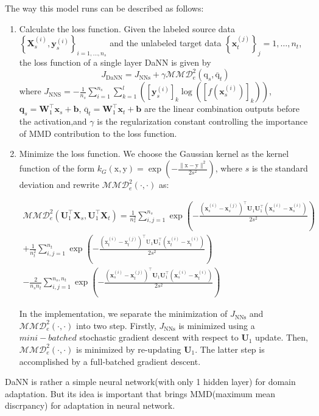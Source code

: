 \documentclass[conference]{IEEEtran}
\begin{document}
The way this model runs can be described as follows:
\begin{enumerate}
\item Calculate the loss function. Given the labeled source data $\left\{\mathbf{X}_{s}^{(i)}, \mathbf{y}_{s}^{(i)}\right\}_{i=1, \ldots, n_{s}}$ and the unlabeled target data $\left\{\mathbf{x}_{t}^{(j)}\right\}_{j}=1, \ldots, n_{t}$, the loss function of a single layer DaNN is given by
\begin{equation}
J_{\mathrm{DaNN}}=J_{\mathrm{NNs}}+\gamma \mathcal{M M D}_{e}^{2}\left(\mathrm{q}_{s}, \overline{\mathrm{q}}_{t}\right)
\end{equation}
where $J_{\mathrm{NNS}}=-\frac{1}{n_{s}} \sum_{i=1}^{n_{s}} \sum_{k=1}^{l}\left(\left[\mathbf{y}_{s}^{(i)}\right]_{k} \log \left(\left[f\left(\mathbf{x}_{s}^{(i)}\right)\right]_{k}\right)\right)$, $\mathbf{q}_{s}=\mathbf{W}_{1}^{\top} \mathbf{x}_{s}+\mathbf{b}$, $\overline{\mathrm{q}}_{t}= \mathbf{W}_{1}^{\top} \mathbf{x}_{t}+\mathbf{b}$ are the linear combination outputs before the activation,and $\gamma$ is the regularization constant controlling the importance of MMD contribution to the loss function.\\
\item Minimize the loss function. We choose the Gaussian kernel as the kernel function of the form $k_{G}(\mathrm{x}, \mathrm{y})=\exp \left(-\frac{\|\mathrm{x}-\mathrm{y}\|^{2}}{2 s^{2}}\right)$, where $s$ is the standard deviation and rewrite $\mathcal{M} \mathcal{M} \mathcal{D}_{e}^{2}(\cdot, \cdot)$ as:
\begin{tiny}
\begin{eqnarray}
\mathcal{M M D}_{e}^{2}\left(\mathbf{U}_{1}^{\top} \mathbf{X}_{s}, \mathbf{U}_{1}^{\top} \mathbf{X}_{t}\right)=\frac{1}{n_{s}^{2}} \sum_{i, j=1}^{n_{s}} \exp \left(-\frac{\left(\mathbf{x}_{s}^{(i)}-\mathbf{x}_{s}^{(j)}\right)^{\top} \mathbf{U}_{1} \mathbf{U}_{1}^{\top}\left(\mathbf{x}_{s}^{(i)}-\mathbf{x}_{s}^{(i)}\right)}{2 s^{2}}\right)\\
+\frac{1}{n_{t}^{2}} \sum_{i, j=1}^{n_{t}} \exp \left(-\frac{\left(\mathrm{x}_{t}^{(i)}-\mathrm{x}_{t}^{(j)}\right)^{\top} \mathrm{U}_{1} \mathbf{U}_{1}^{\top}\left(\mathrm{x}_{t}^{(i)}-\mathrm{x}_{t}^{(i)}\right)}{2 s^{2}}\right)\\
-\frac{2}{n_{s} n_{t}} \sum_{i, j=1}^{n_{s}, n_{t}} \exp \left(-\frac{\left(\mathbf{x}_{s}^{(i)}-\mathbf{x}_{t}^{(j)}\right)^{\top} \mathbf{U}_{1} \mathbf{U}_{1}^{\top}\left(\mathbf{x}_{s}^{(i)}-\mathbf{x}_{t}^{(i)}\right)}{2 s^{2}}\right)
\end{eqnarray}
\end{tiny}
In the implementation, we separate the minimization of $J_{\mathrm{NNs}}$ and $\mathcal{M} \mathcal{M} \mathcal{D}_{e}^{2}(\cdot, \cdot)$ into two step. Firstly, $J_{\mathrm{NNs}}$ is minimized using a $mini-batched$ stochastic gradient descent with respect to $\mathbf{U}_{1}$ update. Then, $\mathcal{M} \mathcal{M} \mathcal{D}_{e}^{2}(\cdot, \cdot)$ is minimized by re-updating $\mathbf{U}_{1}$. The latter step is accomplished by a full-batched
gradient descent.
\end{enumerate}
DaNN is rather a simple neural network(with only 1 hidden layer) for domain adaptation. But its idea is important that brings MMD(maximum mean discrpancy) for adaptation in neural network.
\end{document}
